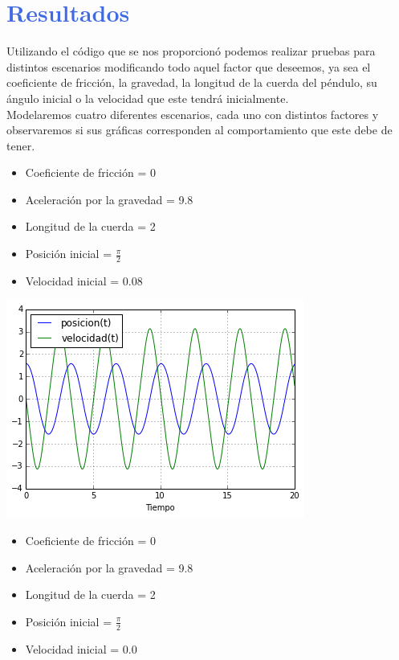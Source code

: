 \documentclass[12pt]{article}
\begin{document}
\pagebreak

\section*{\textcolor{RoyalBlue}{Resultados}}
Utilizando el código que se nos proporcionó podemos realizar pruebas para distintos escenarios modificando todo aquel factor que deseemos, ya sea el coeficiente de fricción, la gravedad, la longitud de la cuerda del péndulo, su ángulo inicial o la velocidad que este tendrá inicialmente.\\
Modelaremos cuatro diferentes escenarios, cada uno con distintos factores y observaremos si sus gráficas corresponden al comportamiento que este debe de tener.\\
\begin{itemize}
\item Coeficiente de fricción = 0
\item Aceleración por la gravedad = 9.8
\item Longitud de la cuerda = 2
\item Posición inicial = $\frac{\pi}{2}$
\item Velocidad inicial = 0.08
\end{itemize}

\includegraphics{5a.png}

\begin{itemize}
\item Coeficiente de fricción = 0
\item Aceleración por la gravedad = 9.8
\item Longitud de la cuerda = 2
\item Posición inicial = $\frac{\pi}{2}$
\item Velocidad inicial = 0.0
\end{itemize}
\end{document}

